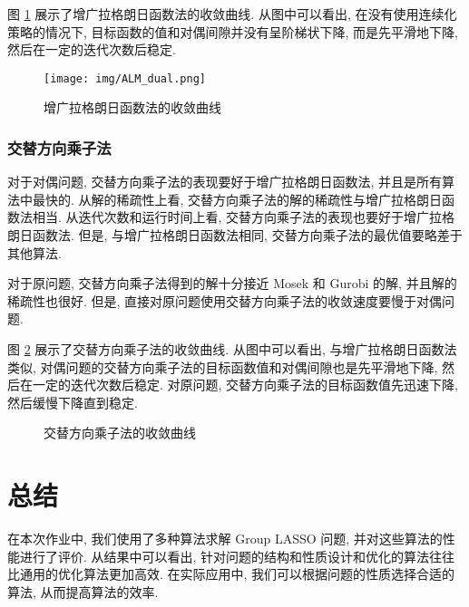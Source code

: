 \documentclass{article}
\begin{document}
图 \ref{fig:ALM} 展示了增广拉格朗日函数法的收敛曲线. 从图中可以看出, 在没有使用连续化策略的情况下, 目标函数的值和对偶间隙并没有呈阶梯状下降, 而是先平滑地下降, 然后在一定的迭代次数后稳定.

\begin{figure}[h]
    \centering
    \texttt{[image: img/ALM\_dual.png]}
    \caption{增广拉格朗日函数法的收敛曲线}
    \label{fig:ALM}
\end{figure}

\subsubsection{交替方向乘子法}

对于对偶问题, 交替方向乘子法的表现要好于增广拉格朗日函数法, 并且是所有算法中最快的. 从解的稀疏性上看, 交替方向乘子法的解的稀疏性与增广拉格朗日函数法相当. 从迭代次数和运行时间上看, 交替方向乘子法的表现也要好于增广拉格朗日函数法. 但是, 与增广拉格朗日函数法相同, 交替方向乘子法的最优值要略差于其他算法.

对于原问题, 交替方向乘子法得到的解十分接近 Mosek 和 Gurobi 的解, 并且解的稀疏性也很好. 但是, 直接对原问题使用交替方向乘子法的收敛速度要慢于对偶问题.

图 \ref{fig:ADMM} 展示了交替方向乘子法的收敛曲线. 从图中可以看出, 与增广拉格朗日函数法类似, 对偶问题的交替方向乘子法的目标函数值和对偶间隙也是先平滑地下降, 然后在一定的迭代次数后稳定. 对原问题, 交替方向乘子法的目标函数值先迅速下降, 然后缓慢下降直到稳定.

\begin{figure}[h]
    \centering
    \caption{交替方向乘子法的收敛曲线}
    \label{fig:ADMM}
\end{figure}

\section{总结}

在本次作业中, 我们使用了多种算法求解 Group LASSO 问题, 并对这些算法的性能进行了评价. 从结果中可以看出, 针对问题的结构和性质设计和优化的算法往往比通用的优化算法更加高效. 在实际应用中, 我们可以根据问题的性质选择合适的算法, 从而提高算法的效率.
\end{document}
